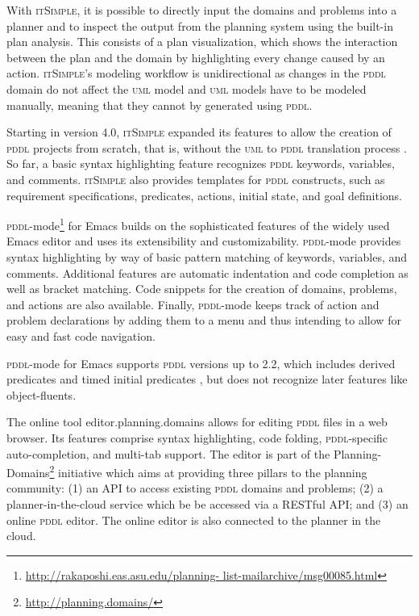 \documentclass[runningheads]{llncs}
\newcommand{\epd}{editor.planning.domains\xspace}
\newcommand{\itsimple}{\textsc{itSimple}\xspace}
\newcommand{\pddlmode}{\textsc{pddl}-mode\xspace}
\newcommand{\pddl}{\textsc{pddl}\xspace}
\newcommand{\uml}{\textsc{uml}\xspace}
\begin{document}
With \itsimple, it is possible to directly input the domains and
problems into a planner and to inspect the output from the planning
system using the built-in plan analysis. This consists of a plan
visualization, which shows the interaction between the plan and the
domain by highlighting every change caused by an action. \itsimple's
modeling workflow is unidirectional as changes in the \pddl domain do
not affect the \uml model and \uml models have to be modeled manually,
meaning that they cannot by generated using \pddl.

Starting in version 4.0, \itsimple expanded its features to allow the
creation of \pddl projects from scratch, that is, without the \uml to
\pddl translation process \cite{vaquero2012itsimple4}. So far, a basic
syntax highlighting feature recognizes \pddl keywords, variables, and
comments. \itsimple also provides templates for \pddl constructs, such
as requirement specifications, predicates, actions, initial state, and
goal definitions.

\pddlmode\footnote{\url{http://rakaposhi.eas.asu.edu/planning-
    list-mailarchive/msg00085.html}} for Emacs builds on the
sophisticated features of the widely used Emacs editor and uses its
extensibility and customizability. \pddlmode provides syntax
highlighting by way of basic pattern matching of keywords, variables,
and comments. Additional features are automatic indentation and code
completion as well as bracket matching. Code snippets for the creation
of domains, problems, and actions are also available. Finally,
\textsc{pddl}-mode keeps track of action and problem declarations by
adding them to a menu and thus intending to allow for easy and fast
code navigation.

\pddlmode for Emacs supports \textsc{pddl} versions up to
2.2, which includes derived predicates and timed initial predicates
\cite{edelkamp2004pddl2}, but does not recognize later features like
object-fluents.

The online tool \epd allows for editing \pddl files in a web
browser. Its features comprise syntax highlighting, code folding,
\pddl-specific auto-completion, and multi-tab support. The editor is
part of the Planning-Domains\footnote{\url{http://planning.domains/}}
initiative which aims at providing three pillars to the planning
community: (1) an API to access existing \pddl domains and problems;
(2) a planner-in-the-cloud service which be be accessed via a RESTful
API; and (3) an online \pddl editor. The online editor is also
connected to the planner in the cloud.
\end{document}
